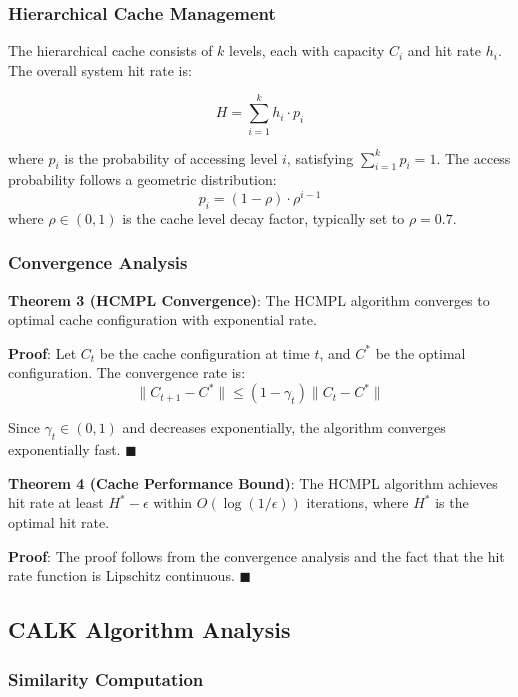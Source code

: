 \documentclass[conference]{IEEEtran}
\begin{document}
\subsubsection{Hierarchical Cache Management}

The hierarchical cache consists of $k$ levels, each with capacity $C_i$ and hit rate $h_i$. The overall system hit rate is:

\begin{equation}
H = \sum_{i=1}^{k} h_i \cdot p_i
\end{equation}

where $p_i$ is the probability of accessing level $i$, satisfying $\sum_{i=1}^{k} p_i = 1$. The access probability follows a geometric distribution:
\begin{equation}
p_i = (1-\rho) \cdot \rho^{i-1}
\end{equation}
where $\rho \in (0,1)$ is the cache level decay factor, typically set to $\rho = 0.7$.

\subsubsection{Convergence Analysis}

\textbf{Theorem 3 (HCMPL Convergence)}: The HCMPL algorithm converges to optimal cache configuration with exponential rate.

\textbf{Proof}: Let $C_t$ be the cache configuration at time $t$, and $C^*$ be the optimal configuration. The convergence rate is:
\begin{equation}
\|C_{t+1} - C^*\| \leq (1-\gamma_t)\|C_t - C^*\|
\end{equation}

Since $\gamma_t \in (0,1)$ and decreases exponentially, the algorithm converges exponentially fast. $\blacksquare$

\textbf{Theorem 4 (Cache Performance Bound)}: The HCMPL algorithm achieves hit rate at least $H^* - \epsilon$ within $O(\log(1/\epsilon))$ iterations, where $H^*$ is the optimal hit rate.

\textbf{Proof}: The proof follows from the convergence analysis and the fact that the hit rate function is Lipschitz continuous. $\blacksquare$

\subsection{CALK Algorithm Analysis}

\subsubsection{Similarity Computation}
\end{document}
